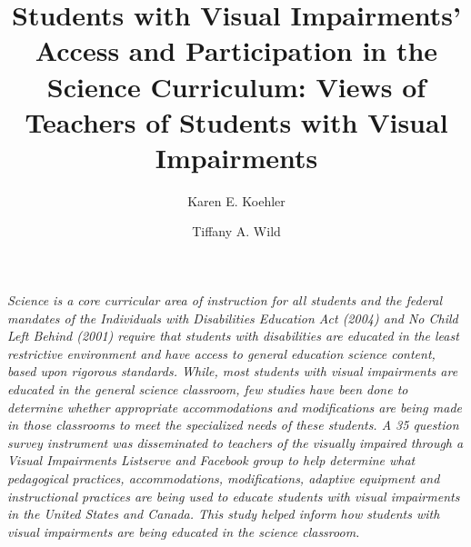 \documentclass[11.5pt]{sig-alternate} %
\makeatletter
\let\oldabstract\abstract
\let\oldendabstract\endabstract
\renewenvironment{abstract} %
{\renewenvironment{quotation}%
               {\list{}{\addtolength{\leftmargin}{1em} %
                        \listparindent 1.5em%
                        \itemindent    \listparindent%
                        \rightmargin   \leftmargin%
                        \parsep        \z@ \@plus\p@}%
                \item\relax}%
               {\endlist}%
\oldabstract}
{\oldendabstract}
\makeatother
\begin{document}
\title{Students with Visual Impairments’ Access and Participation in the Science Curriculum: Views of Teachers of Students with Visual Impairments}

\author[1]{\large \color{blue}Karen E. Koehler}
\author[2]{\large \color{blue}Tiffany A. Wild}


\toappear{}
\maketitle
\begin{@twocolumnfalse} 
\begin{abstract}
\item 
\textit {Science is a core curricular area of instruction for all students and the federal mandates of the Individuals with Disabilities Education Act (2004) and No Child Left Behind (2001) require that students with disabilities are educated in the least restrictive environment and have access to general education science content, based upon rigorous standards. While, most students with visual impairments are educated in the general science classroom, few studies have been done to determine whether appropriate accommodations and modifications are being made in those classrooms to meet the specialized needs of these students. A 35 question survey instrument was disseminated to teachers of the visually impaired through a Visual Impairments Listserve and Facebook group to help determine what pedagogical practices, accommodations, modifications, adaptive equipment and instructional practices are being used to educate students with visual impairments in the United States and Canada. This study helped inform how students with visual impairments are being educated in the science classroom.}
   
\end{abstract}
\end{@twocolumnfalse}

\end{document}
